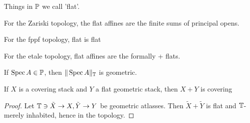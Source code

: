 \documentclass{article}
\begin{document}
Things in $\mathbb{P}$ we call 'flat'.
\begin{example}
	For the Zariski topology, the flat affines are the finite sums of principal opens.
\end{example}
\begin{example}
	For the fppf topology, flat is flat
\end{example}
\begin{example}
	For the etale topology, flat affines are the formally \etale + flats.
\end{example}
\begin{lemma}
	If $\operatorname{Spec} A \in \mathbb{P}$, then $\| \operatorname{Spec} A\|_{\mathbb{T}}$ is geometric.
\end{lemma}
\begin{lemma}
	If $X$ is a covering stack and $Y$ a flat geometric stack, then $X + Y$ is covering
\end{lemma}
\begin{proof}
	Let $\mathbb{T} \ni \tilde X \to X, \tilde Y \to Y$ be geometric atlasses. Then $\tilde X+ \tilde Y$ is flat and $\mathbb{T}$-merely inhabited, hence in the topology.
\end{proof}
\end{document}
